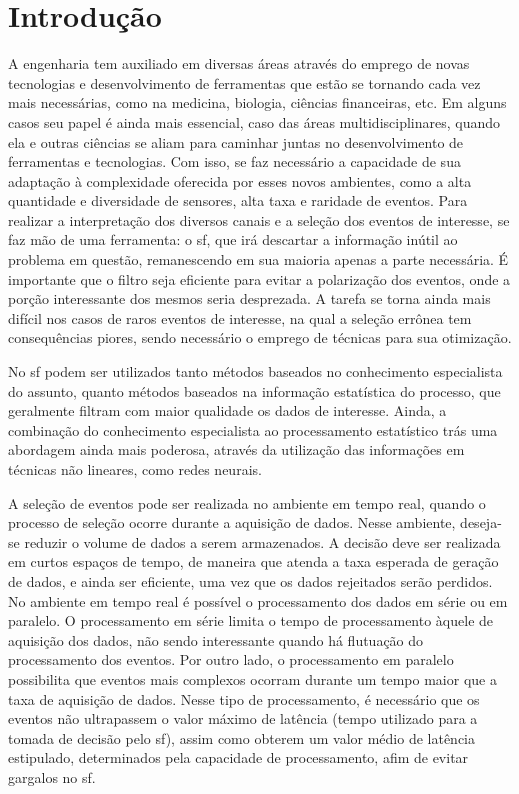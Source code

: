 \chapter{Introdução}
\label{cap:intro}
\glsresetall

A engenharia tem auxiliado em diversas áreas através do emprego de
novas tecnologias e desenvolvimento de ferramentas que estão se tornando cada
vez mais necessárias, como na medicina, biologia, ciências financeiras, etc. Em 
alguns casos seu papel é ainda mais essencial, caso das áreas
multidisciplinares, quando ela e outras ciências se aliam para caminhar juntas no
desenvolvimento de ferramentas e tecnologias. Com isso, se faz necessário a
capacidade de sua adaptação à complexidade oferecida por esses novos ambientes, 
como a alta quantidade e diversidade de sensores, alta taxa e raridade de
eventos. Para realizar a interpretação dos diversos canais e a seleção dos eventos 
de interesse, se faz mão de uma ferramenta: o \glsdesc{sf}, que irá descartar a 
informação inútil ao problema em questão, remanescendo em sua maioria apenas
a parte necessária. É importante que o filtro seja eficiente para evitar a polarização
dos eventos, onde a porção interessante dos mesmos seria desprezada.
A tarefa se torna ainda mais difícil nos casos de raros
eventos de interesse, na qual a seleção errônea tem consequências piores,
sendo necessário o emprego de técnicas para sua otimização. 

No \glsdesc{sf} podem ser utilizados tanto métodos baseados no conhecimento 
especialista do assunto, quanto métodos baseados na informação estatística do processo, 
que geralmente filtram com maior qualidade os dados de interesse. Ainda, 
a combinação do conhecimento especialista ao processamento 
estatístico trás uma abordagem ainda mais poderosa, através da utilização das informações 
em técnicas não lineares, como redes neurais.


A seleção de eventos pode ser realizada no ambiente em tempo real,
quando o processo de seleção ocorre durante a aquisição de dados. Nesse
ambiente, deseja-se reduzir o volume de dados a serem armazenados. A decisão deve ser realizada 
em curtos espaços de tempo, de maneira que atenda a taxa esperada de geração de
dados, e ainda ser eficiente, uma vez que os dados rejeitados serão perdidos. 
No ambiente em tempo real é possível o processamento dos dados em série
ou em paralelo. O processamento em série limita o tempo de processamento àquele
de aquisição dos dados, não sendo interessante quando há flutuação do
processamento dos eventos. Por outro lado, o processamento em
paralelo possibilita que eventos mais complexos ocorram durante um tempo maior
que a taxa de aquisição de dados. Nesse tipo de processamento, é necessário que
os eventos não ultrapassem o valor máximo de latência (tempo utilizado
para a tomada de decisão pelo \glsdesc{sf}), assim como obterem um valor 
médio de latência estipulado, determinados pela capacidade de processamento,
afim de evitar gargalos no \glsdesc{sf}.

